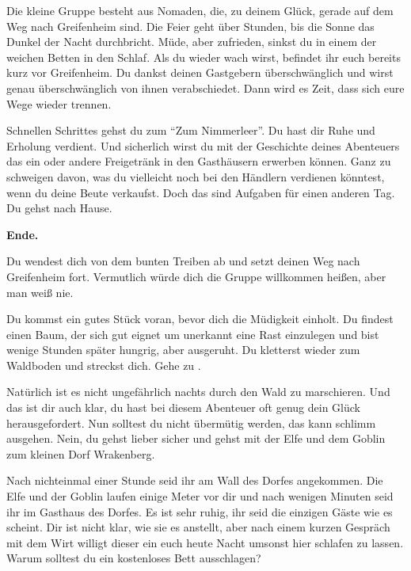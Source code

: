 Die kleine Gruppe besteht aus Nomaden, die, zu deinem Glück, gerade auf dem Weg nach Greifenheim sind. Die Feier geht über Stunden, bis die Sonne das Dunkel der Nacht durchbricht. Müde, aber zufrieden, sinkst du in einem der weichen Betten in den Schlaf. Als du wieder wach wirst, befindet ihr euch bereits kurz vor Greifenheim. Du dankst deinen Gastgebern überschwänglich und wirst genau überschwänglich von ihnen verabschiedet. Dann wird es Zeit, dass sich eure Wege wieder trennen.

Schnellen Schrittes gehst du zum ``Zum Nimmerleer''. Du hast dir Ruhe und Erholung verdient. Und sicherlich wirst du mit der Geschichte deines Abenteuers das ein oder andere Freigetränk in den Gasthäusern erwerben können. Ganz zu schweigen davon, was du vielleicht noch bei den Händlern verdienen könntest, wenn du deine Beute verkaufst. Doch das sind Aufgaben für einen anderen Tag. Du gehst nach Hause.

\textbf{Ende.}


Du wendest dich von dem bunten Treiben ab und setzt deinen Weg nach Greifenheim fort. Vermutlich würde dich die Gruppe willkommen heißen, aber man weiß nie.

Du kommst ein gutes Stück voran, bevor dich die Müdigkeit einholt. Du findest einen Baum, der sich gut eignet um unerkannt eine Rast einzulegen und bist wenige Stunden später hungrig, aber ausgeruht.
Du kletterst wieder zum Waldboden und streckst dich. Gehe zu .


Natürlich ist es nicht ungefährlich nachts durch den Wald zu marschieren.
Und das ist dir auch klar, du hast bei diesem Abenteuer oft genug dein Glück herausgefordert.
Nun solltest du nicht übermütig werden, das kann schlimm ausgehen.
Nein, du gehst lieber sicher und gehst mit der Elfe und dem Goblin zum kleinen Dorf Wrakenberg.

Nach nichteinmal einer Stunde seid ihr am Wall des Dorfes angekommen. Die Elfe und der Goblin laufen einige Meter vor dir und nach wenigen Minuten seid ihr im Gasthaus des Dorfes. Es ist sehr ruhig, ihr seid die einzigen Gäste wie es scheint.
Dir ist nicht klar, wie sie es anstellt, aber nach einem kurzen Gespräch mit dem Wirt willigt dieser ein euch heute Nacht umsonst hier schlafen zu lassen. Warum solltest du ein kostenloses Bett ausschlagen?

